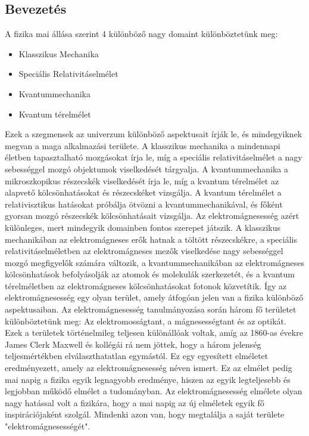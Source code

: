 \documentclass[a4paper,12pt]{article}
\begin{document}
\subsection{Bevezetés}
A fizika mai állása szerint 4 különböző nagy domaint különböztetünk meg:
\begin{itemize}
    \item Klasszikus Mechanika
    \item Speciális Relativitáselmélet
    \item Kvantummechanika
    \item Kvantum térelmélet
\end{itemize}
Ezek a szegmensek az univerzum különböző aspektusait írják le, és mindegyiknek megvan a maga alkalmazási területe. A klasszikus mechanika a mindennapi életben tapasztalható mozgásokat
írja le, míg a speciális relativitáselmélet a nagy sebességgel mozgó objektumok viselkedését tárgyalja. A kvantummechanika a mikroszkopikus részecskék viselkedését írja le, míg a kvantum térelmélet
az alapvető kölcsönhatásokat és részecskéket vizsgálja. A kvantum térelmélet a relativisztikus hatásokat próbálja ötvözni a kvantummechanikával, és főként gyorsan mozgó részecskék kölcsönhatásait vizsgálja.
\newline
\newline
Az elektromágnesesség azért különleges, mert mindegyik domainben fontos szerepet játszik. A klasszikus mechanikában az elektromágneses erők hatnak a töltött részecskékre,
a speciális relativitáselméletben az elektromágneses mezők viselkedése nagy sebességgel mozgó megfigyelők számára változik,
a kvantummechanikában az elektromágneses kölcsönhatások befolyásolják az atomok és molekulák szerkezetét,
és a kvantum térelméletben az elektromágneses kölcsönhatásokat fotonok közvetítik. Így az elektromágnesesség egy olyan terület, amely átfogóan jelen van a fizika különböző aspektusaiban.
\newline
\newline
Az elektromágnesesség tanulmányozása során három fő területet különböztetünk meg: Az elektromosságtant, a mágnesességtant és az optikát.
Ezek a területek történelmileg teljesen különállóak voltak, amíg az 1860-as évekre James Clerk Maxwell és kollégái rá nem jöttek, hogy a három jelenség
teljesmértékben elválaszthatatlan egymástól. Ez egy egyesített elméletet eredményezett, amely az elektromágnesesség néven ismert. Ez az elmélet pedig mai napig a 
fizika egyik legnagyobb eredménye, hiszen az egyik legteljesebb és legjobban működő elmélet a tudományban. Az elektromágnesesség elmélete olyan nagy hatással volt
a fizikára, hogy a mai napig az új elméletek egyik fő inspirációjaként szolgál. Mindenki azon van, hogy megtalálja a saját területe "elektromágnesességét".
\end{document}
